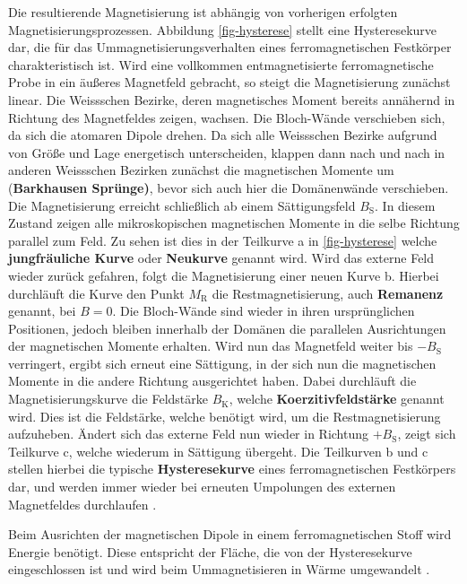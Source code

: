 \documentclass[page,pdftex,12pt,a4paper,twoside,openright]{scrbook}
\begin{document}
Die resultierende Magnetisierung ist abhängig von vorherigen erfolgten Magnetisierungsprozessen. Abbildung \ref{fig-hysterese} stellt eine Hysteresekurve dar, die für das Ummagnetisierungsverhalten eines ferromagnetischen Festkörper charakteristisch ist. Wird eine vollkommen entmagnetisierte ferromagnetische Probe in ein äußeres Magnetfeld gebracht, so steigt die Magnetisierung zunächst linear. Die Weissschen Bezirke, deren magnetisches Moment bereits annähernd in Richtung des Magnetfeldes zeigen, wachsen. Die Bloch-Wände verschieben sich, da sich die atomaren Dipole drehen. Da sich alle Weissschen Bezirke aufgrund von Größe und Lage energetisch unterscheiden, klappen dann nach und nach in anderen Weissschen Bezirken zunächst die magnetischen Momente um (\textbf{Barkhausen Sprünge)}, bevor sich auch hier die Domänenwände verschieben.
Die Magnetisierung erreicht schließlich ab einem Sättigungsfeld \(B_\mathrm{S}\). In diesem Zustand zeigen alle mikroskopischen magnetischen Momente in die selbe Richtung parallel zum Feld. Zu sehen ist dies in der Teilkurve a in \ref{fig-hysterese} welche \textbf{jungfräuliche Kurve} oder \textbf{Neukurve} genannt wird.
Wird das externe Feld wieder zurück gefahren, folgt die Magnetisierung einer neuen Kurve b. Hierbei durchläuft die Kurve den Punkt \(M_\mathrm{R}\) die Restmagnetisierung, auch \textbf{Remanenz} genannt, bei \(B=0\). Die Bloch-Wände sind wieder in ihren ursprünglichen Positionen, jedoch bleiben innerhalb der Domänen die parallelen Ausrichtungen der magnetischen Momente erhalten.
Wird nun das Magnetfeld weiter bis \(-B_\mathrm{S}\) verringert, ergibt sich erneut eine Sättigung, in der sich nun die magnetischen Momente in die andere Richtung ausgerichtet haben. Dabei durchläuft die Magnetisierungskurve die Feldstärke \(B_\mathrm{K}\), welche \textbf{Koerzitivfeldstärke} genannt wird. Dies ist die Feldstärke, welche benötigt wird, um die Restmagnetisierung aufzuheben.
Ändert sich das externe Feld nun wieder in Richtung \(+B_\mathrm{S}\), zeigt sich Teilkurve c, welche wiederum in Sättigung übergeht. Die Teilkurven b und c stellen hierbei die typische \textbf{Hysteresekurve} eines ferromagnetischen Festkörpers dar, und werden immer wieder bei erneuten Umpolungen des externen Magnetfeldes durchlaufen \cite{rybach_physik_2008,demtroder_experimentalphysik_2017}.

Beim Ausrichten der magnetischen Dipole in einem ferromagnetischen Stoff wird Energie benötigt. Diese entspricht der Fläche, die von der Hysteresekurve eingeschlossen ist und wird beim Ummagnetisieren in Wärme umgewandelt \cite{rybach_physik_2008}.
\end{document}
